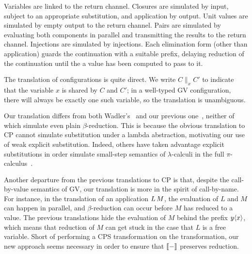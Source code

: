 \documentclass[oribibl,orivec,envcountsame]{llncs}
\begin{document}
Variables are linked to the return channel. Closures are simulated by input, subject to an
appropriate substitution, and application by output. Unit values are simulated by empty output to
the return channel. Pairs are simulated by evaluating both components in parallel and transmitting
the results to the return channel. Injections are simulated by injections. Each elimination form
(other than application) guards the continuation with a suitable prefix, delaying reduction of the
continuation until the a value has been computed to pass to it.

The translation of configurations is quite direct. We write $C \parallel_x C'$ to indicate that the
variable $x$ is shared by $C$ and $C'$; in a well-typed GV configuration, there will always be
exactly one such variable, so the translation is unambiguous.

Our translation differs from both Wadler's~\cite{Wadler14} and our previous one~\cite{LindleyM14},
neither of which simulate even plain $\beta$-reduction. This is because the obvious translation to
CP cannot simulate substitution under a lambda abstraction, motivating our use of weak explicit
substitution.
%
Indeed, others have taken advantage explicit substitutions in order simulate small-step semantics of
$\lambda$-calculi in the full $\pi$-calculus~\cite{BakelV09}.

Another departure from the previous translations to CP is that, despite the call-by-value semantics
of GV, our translation is more in the spirit of call-by-name. For instance, in the translation of an
application $L \, M$, the evaluation of $L$ and $M$ can happen in parallel, and $\beta$-reduction
can occur before $M$ has reduced to a value. The previous translations hide the evaluation of $M$
behind the prefix $y\langle x\rangle$, which means that reduction of $M$ can get stuck in the case that $L$ is
a free variable.
%
Short of performing a CPS transformation on the transformation, our new approach seems necessary in
order to ensure that $\llbracket - \rrbracket$ preserves reduction.
\end{document}
